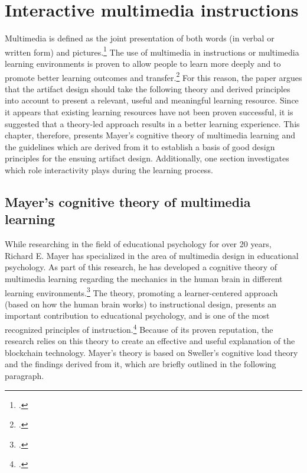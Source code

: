 \chapter{Interactive multimedia instructions} \label{chapter:Multimedia}

Multimedia is defined as the joint presentation of both words (in verbal or written form) and pictures.\footcites[Cf.][p.2]{MayerMultimediaLearning2009}[cf.][p.1205]{MarraffinoApplyingMultimediaLearning2016}[cf.][p.13]{MayerAnimationAidMultimedia2001} The use of multimedia in instructions or multimedia learning environments is proven to allow people to learn more deeply and to promote better learning outcomes and transfer.\footcites[Cf.][p.3]{MayerMultimediaLearning2009}[cf. in addition][]{MunzerLearningmultimediapresentations2009} For this reason, the paper argues that the artifact design should take the following theory and derived principles into account to present a relevant, useful and meaningful learning resource. Since it appears that existing learning resources have not been proven successful, it is suggested that a theory-led approach results in a better learning experience. This chapter, therefore, presents Mayer's cognitive theory of multimedia learning and the guidelines which are derived from it to establish a basis of good design principles for the ensuing artifact design. Additionally, one section investigates which role interactivity plays during the learning process. 

\section{Mayer's cognitive theory of multimedia learning} \label{sec:MayersCTML}
While researching in the field of educational psychology for over 20 years, Richard E. Mayer has specialized in the area of multimedia design in educational psychology. As part of this research, he has developed a cognitive theory of multimedia learning regarding the mechanics in the human brain in different learning environments.\footcites[Cf.][]{MayerMultimediaLearning2009}
The theory, promoting a learner-centered approach (based on how the human brain works) to instructional design, presents an important contribution to educational psychology, and is one of the most recognized principles of instruction.\footcites[Cf.][chapter 1, paragraph 3]{ClarkElearningscienceinstruction2016}[cf.][p.4 et seqq]{MayerMultimediaLearning2009}[cf. in addition][]{SordenCognitiveTheoryMultimedia2012} Because of its proven reputation, the research relies on this theory to create an effective and useful explanation of the blockchain technology.
Mayer's theory is based on Sweller's cognitive load theory and the findings derived from it, which are briefly outlined in the following paragraph.

